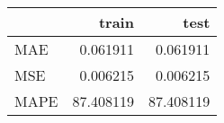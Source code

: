 \begin{tabular}{lrr}
\toprule
{} &      train &       test \\
\midrule
MAE  &   0.061911 &   0.061911 \\
MSE  &   0.006215 &   0.006215 \\
MAPE &  87.408119 &  87.408119 \\
\bottomrule
\end{tabular}

